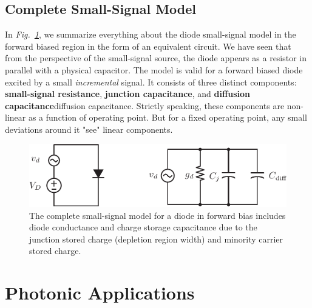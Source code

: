 \subsection{Complete Small-Signal Model}
In \emph{Fig.~\ref{fig:diode_ss_model}}, we summarize everything about the diode small-signal model in the forward biased region in the form of an equivalent circuit.  We have seen that from the perspective of the small-signal source, the diode appears as a resistor in parallel with a physical capacitor.  The model is valid for a forward biased diode excited by a small \emph{incremental} signal.  It consists of three distinct components:  \textbf{small-signal resistance}, \textbf{junction capacitance}, and \textbf{diffusion capacitance}diffusion capacitance.  Strictly speaking, these components are non-linear as a function of operating point.  But for a fixed operating point, any small deviations around it "see" linear components.
\begin{figure}[H]
\centering
\includegraphics[width=.75\columnwidth]{diode_ss_model}
\caption{The complete small-signal model for a diode in forward bias includes diode conductance and charge storage capacitance due to the junction stored charge (depletion region width) and minority carrier stored charge.}
\label{fig:diode_ss_model}
\end{figure}
\newpage
\section{Photonic Applications}
